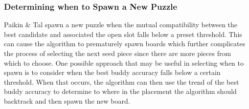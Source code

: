 \documentclass{report}
\begin{document}
\subsubsection{Determining when to Spawn a New Puzzle}\label{sec:limitationWhenToSpawnNewPuzzle}

Paikin \& Tal spawn a new puzzle when the mutual compatibility between the best candidate and associated the open slot falls below a preset threshold.  This can cause the algorithm to prematurely spawn boards which further complicates the process of selecting the next seed piece since there are more pieces from which to choose.  One possible approach that may be useful in selecting when to spawn is to consider when the best buddy accuracy falls below a certain threshold.  When that occurs, the algorithm can then use the trend of the best buddy accuracy to determine to where in the placement the algorithm should backtrack and then spawn the new board.









\pagebreak


\end{document}
